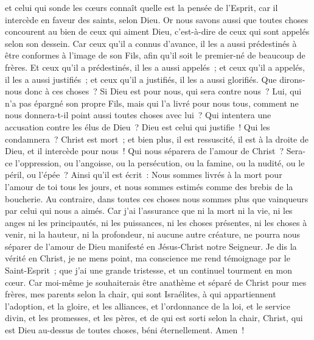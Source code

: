 \begin{multicols}{2}
et celui qui sonde les cœurs connaît quelle est la pensée de l'Esprit, car il intercède en faveur des saints, selon Dieu.
Or nous savons aussi que toutes choses concourent au bien de ceux qui aiment Dieu, c'est-à-dire de ceux qui sont appelés selon son dessein.
Car ceux qu'il a connus d'avance, il les a aussi prédestinés à être conformes à l'image de son Fils, afin qu'il soit le premier-né de beaucoup de frères.
Et ceux qu'il a prédestinés, il les a aussi appelés~; et ceux qu'il a appelés, il les a aussi justifiés~; et ceux qu'il a justifiés, il les a aussi glorifiés.
Que dirons-nous donc à ces choses~? Si Dieu est pour nous, qui sera contre nous~?
Lui, qui n'a pas épargné son propre Fils, mais qui l'a livré pour nous tous, comment ne nous donnera-t-il point aussi toutes choses avec lui~?
Qui intentera une accusation contre les élus de Dieu~? Dieu est celui qui justifie~!
Qui les condamnera~? Christ est mort~; et bien plus, il est ressuscité, il est à la droite de Dieu, et il intercède pour nous~!
Qui nous séparera de l'amour de Christ~? Sera-ce l'oppression, ou l'angoisse, ou la persécution, ou la famine, ou la nudité, ou le péril, ou l'épée~?
Ainsi qu'il est écrit~: Nous sommes livrés à la mort pour l'amour de toi tous les jours, et nous sommes estimés comme des brebis de la boucherie.
Au contraire, dans toutes ces choses nous sommes plus que vainqueurs par celui qui nous a aimés.
Car j'ai l'assurance que ni la mort ni la vie, ni les anges ni les principautés, ni les puissances, ni les choses présentes, ni les choses à venir,
ni la hauteur, ni la profondeur, ni aucune autre créature, ne pourra nous séparer de l'amour de Dieu manifesté en Jésus-Christ notre Seigneur.
\VerseOne{}Je dis la vérité en Christ, je ne mens point, ma conscience me rend témoignage par le Saint-Esprit~;
que j'ai une grande tristesse, et un continuel tourment en mon cœur.
Car moi-même je souhaiterais être anathème et séparé de Christ pour mes frères, mes parents selon la chair,
qui sont Israélites, à qui appartiennent l'adoption, et la gloire, et les alliances, et l'ordonnance de la loi, et le service divin,
et les promesses, et les pères, et de qui est sorti selon la chair, Christ, qui est Dieu au-dessus de toutes choses, béni éternellement. Amen~!

\end{multicols}
